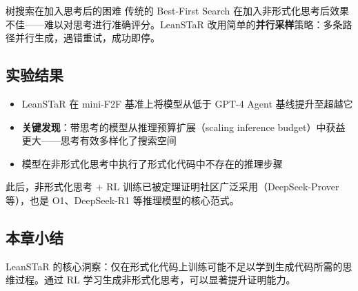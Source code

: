 \begin{warningbox}{树搜索在加入思考后的困难}
传统的 Best-First Search 在加入非形式化思考后效果不佳——难以对思考进行准确评分。LeanSTaR 改用简单的\textbf{并行采样}策略：多条路径并行生成，遇错重试，成功即停。
\end{warningbox}

\subsection{实验结果}

\begin{itemize}
    \item LeanSTaR 在 mini-F2F 基准上将模型从低于 GPT-4 Agent 基线提升至超越它
    \item \textbf{关键发现}：带思考的模型从推理预算扩展（scaling inference budget）中获益更大——思考有效多样化了搜索空间
    \item 模型在非形式化思考中执行了形式化代码中不存在的推理步骤
\end{itemize}

此后，非形式化思考 + RL 训练已被定理证明社区广泛采用（DeepSeek-Prover 等），也是 O1、DeepSeek-R1 等推理模型的核心范式。

\subsection{本章小结}

LeanSTaR 的核心洞察：仅在形式化代码上训练可能不足以学到生成代码所需的思维过程。通过 RL 学习生成非形式化思考，可以显著提升证明能力。

